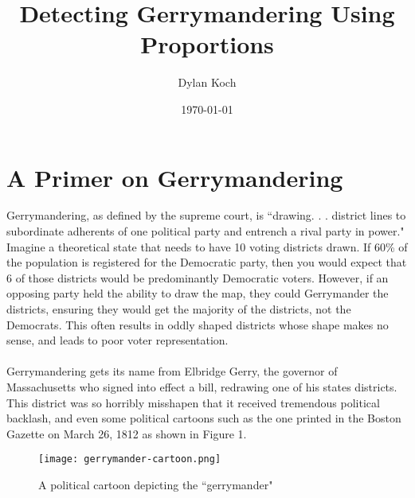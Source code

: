 \documentclass[12pt]{article}
\title{Detecting Gerrymandering Using Proportions}
\author{Dylan Koch}
\date{\today}
\begin{document}
	\maketitle
	

	
	\section{A Primer on Gerrymandering}
	Gerrymandering, as defined by the supreme court, is ``drawing. . . district lines to subordinate adherents of
	one political party and entrench a rival party in
	power."\cite{bondurant}	Imagine a theoretical state that needs to have 10 voting districts drawn. If 60\% of the population is registered for the Democratic party, then you would expect that 6 of those districts would be predominantly Democratic voters.  However, if an opposing party held the ability to draw the map, they could Gerrymander the districts, ensuring they would get the majority of the districts, not the Democrats.  This often results in oddly shaped districts whose shape makes no sense, and leads to poor voter representation.	
	\\
	\\
	Gerrymandering gets its name from Elbridge Gerry, the governor of Massachusetts who signed into effect a bill, redrawing one of his states districts.\cite{trickey}  This district was so horribly misshapen that it received tremendous political backlash, and even some political cartoons such as the one printed in the Boston Gazette on March 26, 1812 as shown in Figure 1. 
		\begin{figure}[H]
			\centering
		\texttt{[image: gerrymander-cartoon.png]}
		\caption{A political cartoon depicting the ``gerrymander"}
	\end{figure}
	
\end{document}
